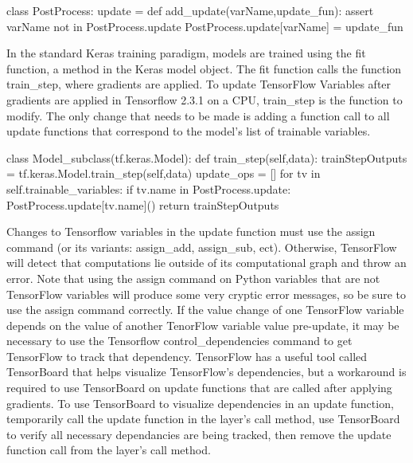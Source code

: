 \begin{code}
class PostProcess:
    update = {}
    def add_update(varName,update_fun):
        assert varName not in PostProcess.update
        PostProcess.update[varName] = update_fun
\end{code}


In the standard Keras training paradigm, models are trained using the fit function, a method in the Keras model object. The fit function calls the function train\_step, where gradients are applied.  To update TensorFlow Variables after gradients are applied in Tensorflow 2.3.1 on a CPU, train\_step is the function to modify. The only change that needs to be made is adding a function call to all update functions that correspond to the model's list of trainable variables.

\begin{code}
class Model_subclass(tf.keras.Model):
    def train_step(self,data):
        trainStepOutputs = tf.keras.Model.train_step(self,data)
        update_ops = []
        for tv in self.trainable_variables:
            if tv.name in PostProcess.update:
                PostProcess.update[tv.name]()
        return trainStepOutputs
\end{code}

Changes to Tensorflow variables in the update function must use the assign command (or its variants: assign\_add, assign\_sub, ect). Otherwise, TensorFlow will detect that computations lie outside of its computational graph and throw an error. Note that using the assign command on Python variables that are not TensorFlow variables will produce some very cryptic error messages, so be sure to use the assign command correctly. If the value change of one TensorFlow variable depends on the value of another TenorFlow variable value pre-update, it may be necessary to use the Tensorflow control\_dependencies command to get TensorFlow to track that dependency. TensorFlow has a useful tool called TensorBoard that helps visualize TensorFlow's dependencies, but a workaround is required to use TensorBoard on update functions that are called after applying gradients. To use TensorBoard to visualize dependencies in an update function, temporarily call the update function in the layer's call method, use TensorBoard to verify all necessary dependancies are being tracked, then remove the update function call from the layer's call method.

